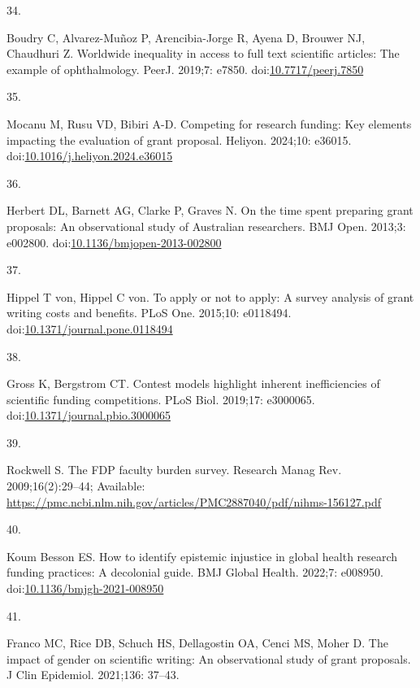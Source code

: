 \documentclass[
  letterpaper,
  DIV=11,
  numbers=noendperiod]{scrartcl}
\newlength{\cslhangindent}
\newlength{\csllabelwidth}
\newenvironment{CSLReferences}[2] %
 {\begin{list}{}{%
  \setlength{\itemindent}{0pt}
  \setlength{\leftmargin}{0pt}
  \setlength{\parsep}{0pt}
  \ifodd #1
   \setlength{\leftmargin}{\cslhangindent}
   \setlength{\itemindent}{-1\cslhangindent}
  \fi
  \setlength{\itemsep}{#2\baselineskip}}}
 {\end{list}}
\newcommand{\CSLLeftMargin}[1]{\parbox[t]{\csllabelwidth}{\strut#1\strut}}
\newcommand{\CSLRightInline}[1]{\parbox[t]{\linewidth - \csllabelwidth}{\strut#1\strut}}
\begin{document}
\begin{CSLReferences}{0}{1}
\CSLLeftMargin{34. }%
\CSLRightInline{Boudry C, Alvarez-Muñoz P, Arencibia-Jorge R, Ayena D,
Brouwer NJ, Chaudhuri Z. Worldwide inequality in access to full text
scientific articles: The example of ophthalmology. PeerJ. 2019;7: e7850.
doi:\href{https://doi.org/10.7717/peerj.7850}{10.7717/peerj.7850}}

\CSLLeftMargin{35. }%
\CSLRightInline{Mocanu M, Rusu VD, Bibiri A-D. Competing for research
funding: Key elements impacting the evaluation of grant proposal.
Heliyon. 2024;10: e36015.
doi:\href{https://doi.org/10.1016/j.heliyon.2024.e36015}{10.1016/j.heliyon.2024.e36015}}

\CSLLeftMargin{36. }%
\CSLRightInline{Herbert DL, Barnett AG, Clarke P, Graves N. On the time
spent preparing grant proposals: An observational study of {Australian}
researchers. BMJ Open. 2013;3: e002800.
doi:\href{https://doi.org/10.1136/bmjopen-2013-002800}{10.1136/bmjopen-2013-002800}}

\CSLLeftMargin{37. }%
\CSLRightInline{Hippel T von, Hippel C von. To apply or not to apply: A
survey analysis of grant writing costs and benefits. PLoS One. 2015;10:
e0118494.
doi:\href{https://doi.org/10.1371/journal.pone.0118494}{10.1371/journal.pone.0118494}}

\CSLLeftMargin{38. }%
\CSLRightInline{Gross K, Bergstrom CT. Contest models highlight inherent
inefficiencies of scientific funding competitions. PLoS Biol. 2019;17:
e3000065.
doi:\href{https://doi.org/10.1371/journal.pbio.3000065}{10.1371/journal.pbio.3000065}}

\CSLLeftMargin{39. }%
\CSLRightInline{Rockwell S. The {FDP} faculty burden survey. Research
Manag Rev. 2009;16(2):29--44; Available:
\url{https://pmc.ncbi.nlm.nih.gov/articles/PMC2887040/pdf/nihms-156127.pdf}}

\CSLLeftMargin{40. }%
\CSLRightInline{Koum Besson ES. How to identify epistemic injustice in
global health research funding practices: A decolonial guide. BMJ Global
Health. 2022;7: e008950.
doi:\href{https://doi.org/10.1136/bmjgh-2021-008950}{10.1136/bmjgh-2021-008950}}

\CSLLeftMargin{41. }%
\CSLRightInline{Franco MC, Rice DB, Schuch HS, Dellagostin OA, Cenci MS,
Moher D. The impact of gender on scientific writing: An observational
study of grant proposals. J Clin Epidemiol. 2021;136: 37--43. }

\end{CSLReferences}
\end{document}
